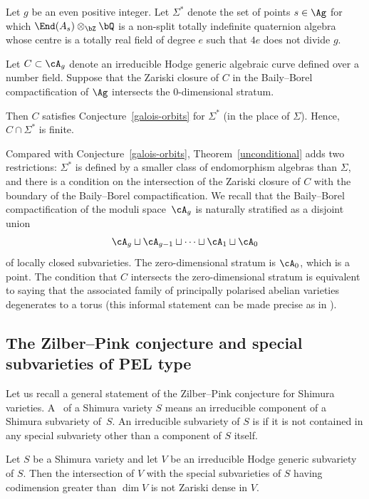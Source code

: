 \begin{theorem}\label{unconditional}
Let $g$ be an even positive integer.
Let $\Sigma^*$ denote the set of points $s \in \Ag$ for which $\End(A_s) \otimes_\bZ \bQ$ is a non-split totally indefinite quaternion algebra whose centre is a totally real field of degree $e$ such that $4e$ does not divide $g$.

Let $C\subset\cA_g$ denote an irreducible Hodge generic algebraic curve defined over a number field. Suppose that the Zariski closure of $C$ in the Baily--Borel compactification of $\Ag$ intersects the $0$-dimensional stratum.

Then $C$ satisfies Conjecture~\ref{galois-orbits} for $\Sigma^*$ (in the place of $\Sigma$). Hence, $C \cap \Sigma^*$ is finite.
\end{theorem}

Compared with Conjecture~\ref{galois-orbits}, Theorem~\ref{unconditional} adds two restrictions: $\Sigma^*$ is defined by a smaller class of endomorphism algebras than $\Sigma$, and there is a condition on the intersection of the Zariski closure of $C$ with the boundary of the Baily--Borel compactification.
We recall that the Baily--Borel compactification of the moduli space~$\cA_g$ is naturally stratified as a disjoint union
\[\cA_g\sqcup\cA_{g-1}\sqcup\cdots\sqcup\cA_1\sqcup\cA_0\]
of locally closed subvarieties.
The zero-dimensional stratum is $\cA_0$, which is a point.
The condition that $C$ intersects the zero-dimensional stratum is equivalent to saying that the associated family of principally polarised abelian varieties degenerates to a torus (this informal statement can be made precise as in \cite[Th.\,1.4]{ExCM}).

\subsection{The Zilber--Pink conjecture and special subvarieties of PEL type} \label{subsec:intro-zp-context}

Let us recall a general statement of the Zilber--Pink conjecture for Shimura varieties. A~ of a Shimura variety $S$ means an irreducible component of a Shimura subvariety of~$S$.
An irreducible subvariety of $S$ is  if it is not contained in any special subvariety other than a component of $S$ itself.

\begin{conjecture} \label{zilber-pink}
Let $S$ be a Shimura variety and let $V$ be an irreducible Hodge generic subvariety of $S$.
Then the intersection of $V$ with the special subvarieties of $S$ having codimension greater than $\dim V$ is not Zariski dense in $V$.
\end{conjecture}

